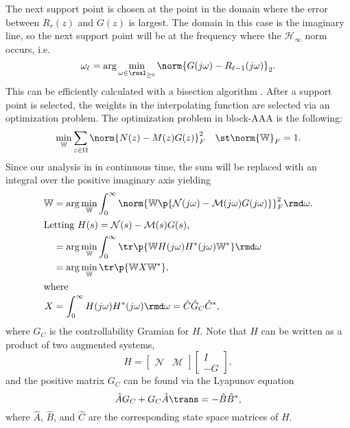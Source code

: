 \documentclass[letterpaper, 10 pt, conference]{ieeeconf}  %
\newcommand{\non}{\nonumber}
\newcommand{\mbb}[1]{\mathbb{#1}}
\newcommand{\mcal}[1]{\mathcal{#1}}
\begin{document}
The next support point is chosen at the point in the domain where the error between \(R_r(z)\) and \(G(z)\) is largest.  The domain in this case is the imaginary line, so the next support point will be at the frequency where the \(\mcal{H}_\infty\) norm occurs, i.e.
\begin{equation}
        \omega_\ell = \arg\min_{\omega\in\real_{\geq 0}} \norm{G(j\omega) - R_{\ell-1}(j\omega)}_2.
\end{equation}
This can be efficiently calculated with a bisection algorithm \cite{Bruinsma90}.  After a support point is selected, the weights in the interpolating function are selected via an optimization problem.  The optimization problem in block-AAA is the following: 
\[\min_{\mbb{W}} \sum_{z\in\Omega} \norm{N(z)-M(z)G(z)}^2_F \quad \st \norm{\mbb{W}}_F = 1.\]
Since our analysis in in continuous time, the sum will be replaced with an integral over the positive imaginary axis yielding
\begin{align}
    \mbb{W} &= \arg\min_{\mbb{W}} \int_0^\infty \norm{\mbb{W}\p{\mcal{N}(j\omega)-\mcal{M}(j\omega)G(j\omega)}}_F^2 \rmd\omega. \non \\
    \shortintertext{Letting \(H(s) = \mcal{N}(s) - \mcal{M}(s)G(s)\),}
    &= \arg\min_{\mbb{W}} \int_0^\infty \tr\p{\mbb{W}H(j\omega)H^*(j\omega)\mbb{W}^*} \rmd\omega \non \\
    &= \arg\min_{\mbb{W}} \tr\p{\mbb{W}X\mbb{W}^*}, \non \\
    \shortintertext{where}
    X &= \int_0^\infty H(j\omega)H^*(j\omega)\rmd\omega = \hat{C}\hat{G}_C\hat{C}^*, \label{x_eq}
\end{align}
where \(G_C\) is the controllability Gramian for \(H\).  Note that \(H\) can be written as a product of two augmented systems,
\begin{equation}
        H = \begin{bmatrix}\mcal{N} & \mcal{M}\end{bmatrix} \begin{bmatrix}I \\ -G\end{bmatrix}, \label{h_eq}
\end{equation}
and the positive matrix \(G_C\) can be found via the Lyapunov equation \cite[p. 112]{Zhou95} 
\begin{equation}
        \hat{A}G_C + G_C\hat{A}\trans = -\hat{B}\hat{B}^*, \label{x_lyap}
\end{equation}
where \(\hat{A}\), \(\hat{B}\), and \(\hat{C}\) are the corresponding state space matrices of \(H\).
\end{document}
